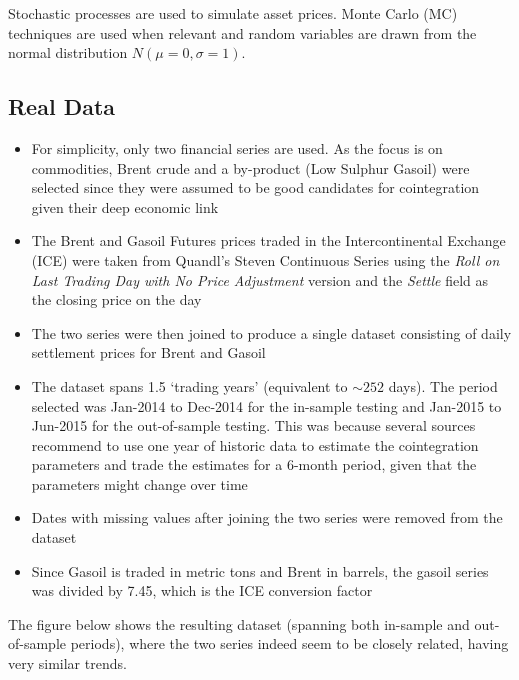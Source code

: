\documentclass[11pt]{article}
\providecommand{\tightlist}{%
      \setlength{\itemsep}{0pt}\setlength{\parskip}{0pt}}
\begin{document}
    
Stochastic processes are used to  simulate asset prices. Monte
Carlo (MC) techniques are used when relevant and  random variables are drawn from the normal distribution $N(\mu=0, \sigma=1)$.


    \subsection{Real Data}\label{real-data}
    
    
    \begin{itemize}
\tightlist
\item
  For simplicity, only two financial series are used. As the focus is on  commodities, Brent crude and a
  by-product (Low Sulphur Gasoil) were selected since they were assumed
  to be good candidates for cointegration given their deep economic link
\item
  The
  Brent \cite{Brent}
  and
  Gasoil \cite{Gasoil}
  Futures prices traded in the Intercontinental Exchange (ICE) were
  taken from
  Quandl's  Steven Continuous Series \cite{Quandl'sStevenContinuousSeries} using the {\em Roll on Last Trading Day with No
  Price Adjustment} version and the {\em Settle} field as the closing price on the day
\item
  The two series were then joined to produce a single dataset consisting of
  daily settlement prices for Brent and Gasoil
\item
  The dataset spans 1.5 `trading years' (equivalent to $\sim 252$ days). The period selected was
  Jan-2014 to Dec-2014 for the in-sample testing and Jan-2015 to
  Jun-2015 for the out-of-sample testing. This was because several
  sources recommend to use one year of historic data to estimate the
  cointegration parameters and trade the estimates for a 6-month period,
  given that the parameters might change over time
\item
  Dates with missing values after joining the two series were removed from the dataset
\item
  Since Gasoil is traded in metric tons and Brent in barrels, the gasoil
  series was divided by 7.45, which is the
  ICE  conversion factor \cite{ICEconversionfactor}
\end{itemize}
The figure below shows the resulting dataset (spanning both in-sample
and out-of-sample periods), where the two series indeed seem to be
closely related, having very similar trends.
    \begin{center}
    \end{center}
    { \hspace*{\fill} \\}
    
\end{document}
